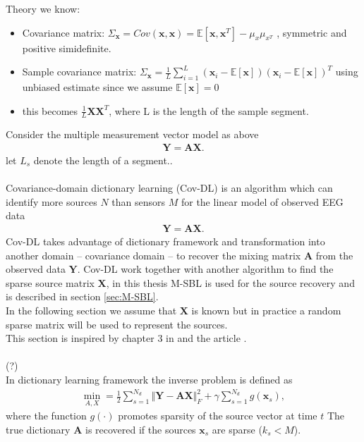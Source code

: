 {\begin{itemize}
\end{itemize}
Theory we know:
\begin{itemize}
\item Covariance matrix: $\Sigma_{\textbf{x}} = Cov(\textbf{x},\textbf{x}) = \mathbb{E}[ \textbf{x},\textbf{x}^T ]-\mu_{x}\mu_{x^{T}}$ , symmetric and positive simidefinite.
\item Sample covariance matrix: $\Sigma_{\textbf{x}} = \frac{1}{L} \sum_{i=1}^{L}(\textbf{x}_i-\mathbb{E}[\textbf{x}])(\textbf{x}_i-\mathbb{E}[\textbf{x}])^T$ using unbiased estimate since we assume $\mathbb{E}[\textbf{x}]=0$
\item this becomes $\frac{1}{L}\textbf{X}\textbf{X}^T$, where L is the length of the sample segment. 
\end{itemize}
}
Consider the multiple measurement vector model as above
\begin{align*}
\mathbf{Y} = \mathbf{AX}.
\end{align*}
let $L_s$ denote the length of a segment.. \\ \\
Covariance-domain dictionary learning (Cov-DL) is an algorithm which can identify more sources $N$ than sensors $M$ for the linear model of observed EEG data
\begin{align*}
\mathbf{Y} = \mathbf{AX}.
\end{align*}
Cov-DL takes advantage of dictionary framework and transformation into another domain -- covariance domain -- to recover the mixing matrix $\mathbf{A}$ from the observed data $\mathbf{Y}$. Cov-DL work together with another algorithm to find the sparse source matrix $\mathbf{X}$, in this thesis M-SBL is used for the source recovery and is described in section \ref{sec:M-SBL}. 
\\
In the following section we assume that $\mathbf{X}$ is known but in practice a random sparse matrix will be used to represent the sources. 
\\
This section is inspired by chapter 3 in \cite{phd2015} and the article \cite{Balkan2015}.
\\ \\
(?)\\
In dictionary learning framework the inverse problem is defined as
\begin{align*}
\min_{A,X} = \frac{1}{2} \sum_{s=1}^{N_d} \Vert \mathbf{Y} - \mathbf{AX} \Vert_F^2 + \gamma \sum_{s=1}^{N_d} g(\mathbf{x}_s),
\end{align*}
where the function $g(\cdot)$ promotes sparsity of the source vector at time $t$ 
The true dictionary $\mathbf{A}$ is recovered if the sources $\mathbf{x}_s$ are sparse ($k_s < M$).


